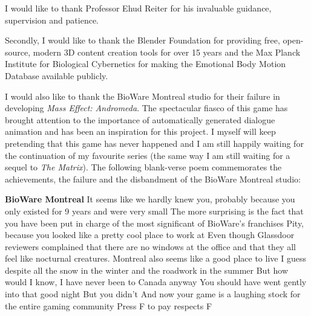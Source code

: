 \documentclass[phd]{abdnthesis}
\begin{document}
\begin{acknowledgements}
  I would like to thank Professor Ehud Reiter for his invaluable guidance, supervision and patience. 

  Secondly, I would like to thank the Blender Foundation for providing free, open-source, modern 3D content creation tools for over 15 years and the Max Planck Institute for Biological Cybernetics for making the Emotional Body Motion Database available publicly.
  
  I would also like to thank the BioWare Montreal studio for their failure in developing \textit{Mass Effect: Andromeda}. The spectacular fiasco of this game has brought attention to the importance of automatically generated dialogue animation and has been an inspiration for this project. I myself will keep pretending that this game has never happened and I am still happily waiting for the continuation of my favourite series (the same way I am still waiting for a sequel to \textit{The Matrix}). The following blank-verse poem commemorates the achievements, the failure and the disbandment of the BioWare Montreal studio:
  
  \bigskip
  \noindent \textbf{BioWare Montreal}\newline
  It seems like we hardly knew you,\newline
  probably because you only existed for 9 years and were very small\newline
  The more surprising is the fact that\newline
  you have been put in charge of the most significant of BioWare's franchises\newline
  \newline
  Pity,\newline
  because you looked like a pretty cool place to work at\newline
  Even though Glassdoor reviewers complained that there are no windows at the office\newline
  and that they all feel like nocturnal creatures.\newline
  Montreal also seems like a good place to live I guess\newline
  despite all the snow in the winter and the roadwork in the summer\newline
  But how would I know, I have never been to Canada anyway\newline
  \newline
  You should have went gently into that good night\newline
  But you didn't\newline
  And now your game is a laughing stock for the entire gaming community\newline
  Press F to pay respects\newline
  F
  
  
  
  
\end{acknowledgements}
\end{document}
